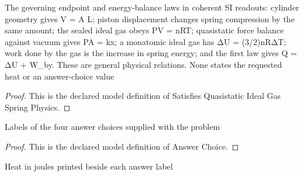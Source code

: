 \begin{definition}
  \label{def:physics:phyx-mini-0416:phyxminiproblems-problemphyxmini0416-satisfiesquasistaticidealgasspringphysics}
  The governing endpoint and energy-balance laws in coherent SI readouts: cylinder geometry gives V = A L; piston displacement changes spring compression by the same amount; the sealed ideal gas obeys PV = nRT; quasistatic force balance against vacuum gives PA = kx; a monatomic ideal gas has ΔU = (3/2)nRΔT; work done by the gas is the increase in spring energy; and the first law gives Q = ΔU + W\_by. These are general physical relations. None states the requested heat or an answer-choice value
\end{definition}
\begin{proof}
  This is the declared model definition of Satisfies Quasistatic Ideal Gas Spring Physics.
\end{proof}
\begin{definition}
  \label{def:physics:phyx-mini-0416:phyxminiproblems-problemphyxmini0416-answerchoice}
  Labels of the four answer choices supplied with the problem
\end{definition}
\begin{proof}
  This is the declared model definition of Answer Choice.
\end{proof}
\begin{definition}
  \label{def:physics:phyx-mini-0416:phyxminiproblems-problemphyxmini0416-displayedheatinjoules}
  Heat in joules printed beside each answer label
\end{definition}
